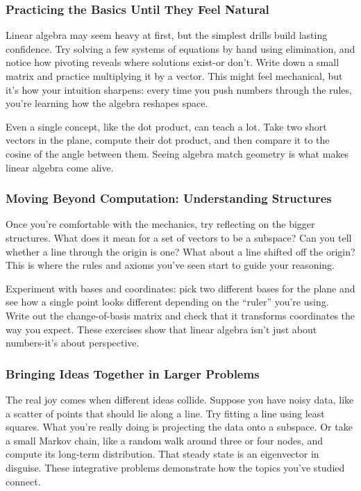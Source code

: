 \documentclass[
  letterpaper,
  DIV=11,
  numbers=noendperiod]{scrreprt}
\begin{document}
\subsubsection{Practicing the Basics Until They Feel
Natural}\label{practicing-the-basics-until-they-feel-natural}

Linear algebra may seem heavy at first, but the simplest drills build
lasting confidence. Try solving a few systems of equations by hand using
elimination, and notice how pivoting reveals where solutions exist-or
don't. Write down a small matrix and practice multiplying it by a
vector. This might feel mechanical, but it's how your intuition
sharpens: every time you push numbers through the rules, you're learning
how the algebra reshapes space.

Even a single concept, like the dot product, can teach a lot. Take two
short vectors in the plane, compute their dot product, and then compare
it to the cosine of the angle between them. Seeing algebra match
geometry is what makes linear algebra come alive.

\subsubsection{Moving Beyond Computation: Understanding
Structures}\label{moving-beyond-computation-understanding-structures}

Once you're comfortable with the mechanics, try reflecting on the bigger
structures. What does it mean for a set of vectors to be a subspace? Can
you tell whether a line through the origin is one? What about a line
shifted off the origin? This is where the rules and axioms you've seen
start to guide your reasoning.

Experiment with bases and coordinates: pick two different bases for the
plane and see how a single point looks different depending on the
``ruler'' you're using. Write out the change-of-basis matrix and check
that it transforms coordinates the way you expect. These exercises show
that linear algebra isn't just about numbers-it's about perspective.

\subsubsection{Bringing Ideas Together in Larger
Problems}\label{bringing-ideas-together-in-larger-problems}

The real joy comes when different ideas collide. Suppose you have noisy
data, like a scatter of points that should lie along a line. Try fitting
a line using least squares. What you're really doing is projecting the
data onto a subspace. Or take a small Markov chain, like a random walk
around three or four nodes, and compute its long-term distribution. That
steady state is an eigenvector in disguise. These integrative problems
demonstrate how the topics you've studied connect.
\end{document}
